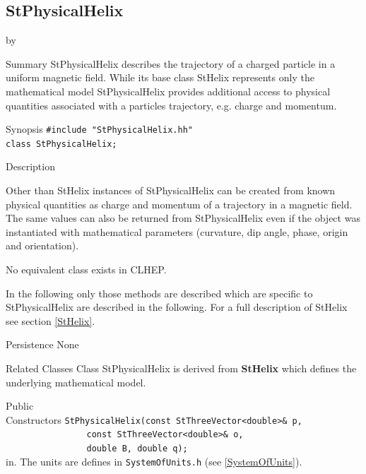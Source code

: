\documentclass[twoside]{article}
\newcommand{\entrylabel}[1]{\mbox{\textbf{{#1}}}\hfil}%
\newenvironment{entry}
{\begin{list}{}%
    {\renewcommand{\makelabel}{\entrylabel}%
     \setlength{\labelwidth}{90pt}%
     \setlength{\leftmargin}{\labelwidth}
     \advance\leftmargin by \labelsep%
      }%
    }%
  {\end{list}}
\newcommand{\Entrylabel}[1]%
{\raisebox{0pt}[1ex][0pt]{\makebox[\labelwidth][l]%
    {\parbox[t]{\labelwidth}{\hspace{0pt}\textbf{{#1}}}}}}
\newenvironment{Entry}%
{\renewcommand{\entrylabel}{\Entrylabel}\begin{entry}}%
  {\end{entry}}
\begin{document}
%
%
\subsection{StPhysicalHelix } \label{StPhysicalHelix}
\begin{Entry}
\item[Summary]
    StPhysicalHelix describes the trajectory of a charged particle in a
    uniform magnetic field. While its base class StHelix 
    represents only the mathematical model StPhysicalHelix provides
    additional access to physical quantities associated with a particles
    trajectory, e.g. charge and momentum.

\item[Synopsis]
    \verb+#include "StPhysicalHelix.hh"+\\
    \verb+class StPhysicalHelix;+    
    
\item[Description]   

    Other than StHelix instances of StPhysicalHelix can be created
    from known physical quantities as charge and momentum
    of a trajectory in a magnetic
    field. The same values can also be returned from
    StPhysicalHelix even if the object was instantiated with mathematical
    parameters (curvature, dip angle, phase, origin and orientation).
        
    No equivalent class exists in CLHEP.

    In the following only those methods are described which are specific
    to StPhysicalHelix are described in the following. For a full description of
    StHelix see section \ref{StHelix}.
    
\item[Persistence]
    None

\item[Related Classes]
    Class StPhysicalHelix is derived from {\bf StHelix}
    which defines the underlying mathematical model.
    
\item[Public\\ Constructors]
    \verb+StPhysicalHelix(const StThreeVector<double>& p, + \\
    \verb+                const StThreeVector<double>& o, + \\
    \verb+                double B, double q);+ \\
    in. The units are defines in \texttt{SystemOfUnits.h}
    (see \ref{SystemOfUnits}).
    

\end{Entry}
\end{document}
